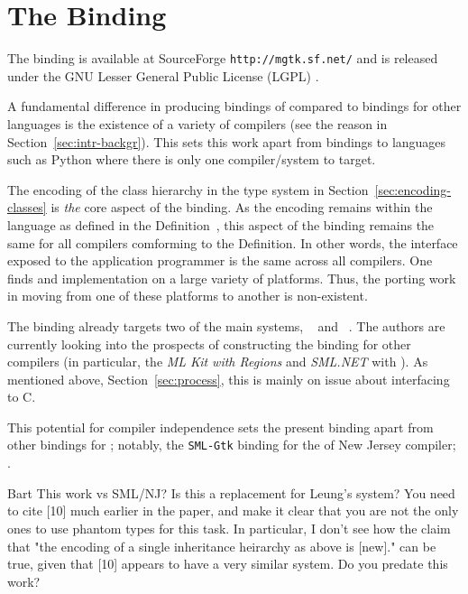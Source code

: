 \documentclass[workingdraft]{usetex-v1}
\begin{document}
\section{The \mgtk Binding}
\label{sec:mgtk-binding}

The \mgtk binding is available at SourceForge \texttt{http://mgtk.sf.net/}
and is released under the GNU Lesser General Public License
(LGPL) \cite{LGPL:1999}.

A fundamental difference in producing \sml bindings of \gtk compared
to bindings for other languages is the existence of a variety of
compilers (see the reason in Section~\ref{sec:intr-backgr}). This sets
this work apart from bindings to languages such as Python where
there is only one compiler/system to target. 

The encoding of the \gtk class hierarchy in the \sml type system in
Section~\ref{sec:encoding-classes} is \emph{the} core aspect of the
binding. As the encoding remains within the language as defined in the
Definition~\cite{Milner:1997:Definition}, this aspect of the binding
remains the same for all \sml compilers comforming to the Definition.
In other words, the interface exposed to the application programmer is
the same across all compilers.
%
One finds \sml and \gtk implementation on a large variety of
platforms. Thus, the porting work in moving from one of these
platforms to another is non-existent.

The \mgtk binding already targets two of the main \sml systems,
\mosml~\cite{Mosml-webpage:2003} and \mlton~\cite{MLton-webpage:2003}.
The authors are currently looking into the prospects of constructing
the binding for other \sml compilers (in particular, the \emph{ML Kit
  with Regions} \cite{MLKit-webpage:2003} and \emph{SML.NET}
\cite{SML.NET-webpage:2003} with \gtksharp). As mentioned above,
Section~\ref{sec:process}, this is mainly on issue about interfacing
to C.

This potential for compiler independence sets the present binding
apart from other \gtk bindings for \sml; notably, the \texttt{SML-Gtk}
binding for the \sml of New Jersey compiler;
\cite{SML-Gtk-webpage:2003}.

\begin{ednote}{Bart}
  This work vs SML/NJ?  Is this a replacement for Leung's
system?  You need to cite [10] much earlier in the paper,
and make it clear that you are not the only ones to use
phantom types for this task.  In particular, I don't see how
the claim that "the encoding of a single inheritance
heirarchy as above is [new]." can be true, given that [10]
appears to have a very similar system.  Do you predate this
work?

\end{ednote}
\end{document}
